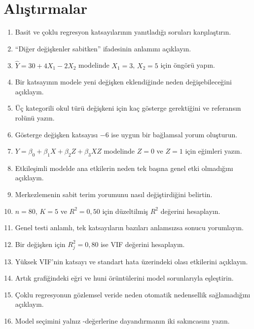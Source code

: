 
\section*{Alıştırmalar}

\begin{enumerate}
  \item Basit ve çoklu regresyon katsayılarının yanıtladığı soruları karşılaştırın.
  \item ``Diğer değişkenler sabitken'' ifadesinin anlamını açıklayın.
  \item $\hat Y=30+4X_1-2X_2$ modelinde $X_1=3$, $X_2=5$ için öngörü yapın.
  \item Bir katsayının modele yeni değişken eklendiğinde neden değişebileceğini açıklayın.
  \item Üç kategorili okul türü değişkeni için kaç gösterge gerektiğini ve referansın rolünü yazın.
  \item Gösterge değişken katsayısı $-6$ ise uygun bir bağlamsal yorum oluşturun.
  \item $Y=\beta_0+\beta_1X+\beta_2Z+\beta_3XZ$ modelinde $Z=0$ ve $Z=1$ için eğimleri yazın.
  \item Etkileşimli modelde ana etkilerin neden tek başına genel etki olmadığını açıklayın.
  \item Merkezlemenin sabit terim yorumunu nasıl değiştirdiğini belirtin.
  \item $n=80$, $K=5$ ve $R^2=0{,}50$ için düzeltilmiş $R^2$ değerini hesaplayın.
  \item Genel \Fstat testi anlamlı, tek katsayıların bazıları anlamsızsa sonucu yorumlayın.
  \item Bir değişken için $R_j^2=0{,}80$ ise VIF değerini hesaplayın.
  \item Yüksek VIF'nin katsayı ve standart hata üzerindeki olası etkilerini açıklayın.
  \item Artık grafiğindeki eğri ve huni örüntülerini model sorunlarıyla eşleştirin.
  \item Çoklu regresyonun gözlemsel veride neden otomatik nedensellik sağlamadığını açıklayın.
  \item Model seçimini yalnız \pval-değerlerine dayandırmanın iki sakıncasını yazın.
\end{enumerate}

